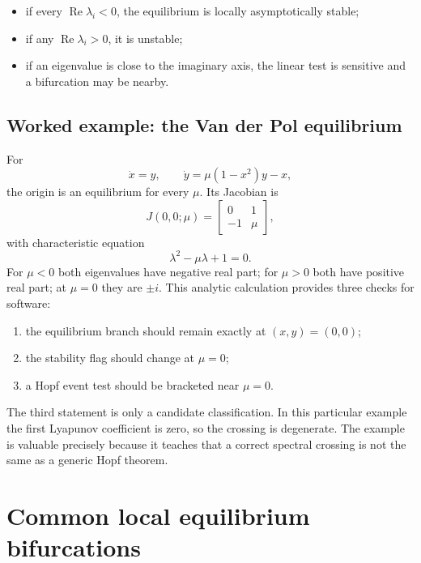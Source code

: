 \documentclass[11pt,oneside]{book}
\begin{document}
\begin{itemize}
  \item if every $\operatorname{Re}\lambda_i<0$, the equilibrium is locally
        asymptotically stable;
  \item if any $\operatorname{Re}\lambda_i>0$, it is unstable;
  \item if an eigenvalue is close to the imaginary axis, the linear test is
        sensitive and a bifurcation may be nearby.
\end{itemize}

\subsection{Worked example: the Van der Pol equilibrium}

For
\[
  \dot x=y,\qquad \dot y=\mu(1-x^2)y-x,
\]
the origin is an equilibrium for every $\mu$. Its Jacobian is
\[
  J(0,0;\mu)=\begin{bmatrix}0&1\\-1&\mu\end{bmatrix},
\]
with characteristic equation
\[
  \lambda^2-\mu\lambda+1=0.
\]
For $\mu<0$ both eigenvalues have negative real part; for $\mu>0$ both have
positive real part; at $\mu=0$ they are $\pm i$. This analytic calculation
provides three checks for software:

\begin{enumerate}
  \item the equilibrium branch should remain exactly at $(x,y)=(0,0)$;
  \item the stability flag should change at $\mu=0$;
  \item a Hopf event test should be bracketed near $\mu=0$.
\end{enumerate}

The third statement is only a candidate classification. In this particular
example the first Lyapunov coefficient is zero, so the crossing is degenerate.
The example is valuable precisely because it teaches that a correct spectral
crossing is not the same as a generic Hopf theorem.

\section{Common local equilibrium bifurcations}
\end{document}
